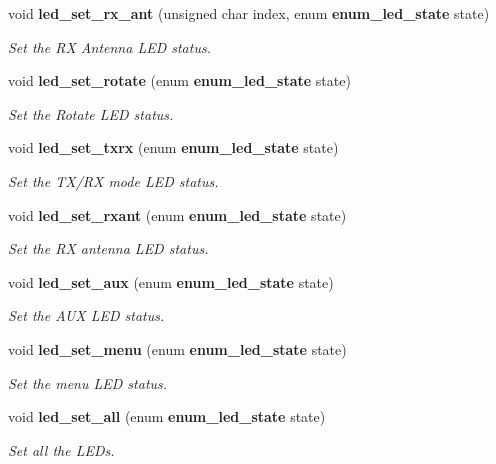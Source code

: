 \begin{CompactItemize}
void {\bf led\_\-set\_\-rx\_\-ant} (unsigned char index, enum {\bf enum\_\-led\_\-state} state)
\begin{CompactList}\small\item\em Set the RX Antenna LED status. \item\end{CompactList}\item 
void {\bf led\_\-set\_\-rotate} (enum {\bf enum\_\-led\_\-state} state)
\begin{CompactList}\small\item\em Set the Rotate LED status. \item\end{CompactList}\item 
void {\bf led\_\-set\_\-txrx} (enum {\bf enum\_\-led\_\-state} state)
\begin{CompactList}\small\item\em Set the TX/RX mode LED status. \item\end{CompactList}\item 
void {\bf led\_\-set\_\-rxant} (enum {\bf enum\_\-led\_\-state} state)
\begin{CompactList}\small\item\em Set the RX antenna LED status. \item\end{CompactList}\item 
void {\bf led\_\-set\_\-aux} (enum {\bf enum\_\-led\_\-state} state)
\begin{CompactList}\small\item\em Set the AUX LED status. \item\end{CompactList}\item 
void {\bf led\_\-set\_\-menu} (enum {\bf enum\_\-led\_\-state} state)
\begin{CompactList}\small\item\em Set the menu LED status. \item\end{CompactList}\item 
void {\bf led\_\-set\_\-all} (enum {\bf enum\_\-led\_\-state} state)
\begin{CompactList}\small\item\em Set all the LEDs. \item\end{CompactList}\end{CompactItemize}


